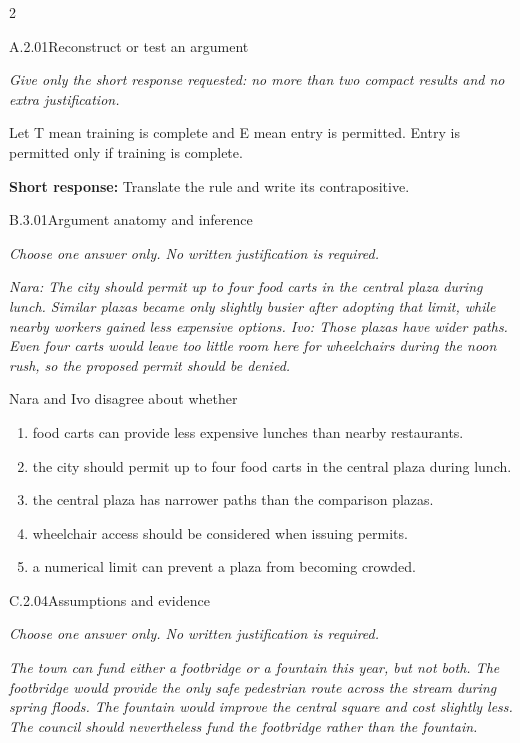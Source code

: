 \documentclass[9pt]{extarticle}
\newcommand{\choice}[1]{\item #1}
\begin{document}
\begin{multicols}{2}
\begin{DenseCoreProblem}{A.2.01}{Reconstruct or test an argument}
{\scriptsize\textit{Give only the short response requested: no more than two compact results and no extra justification.}\par}
Let T mean training is complete and E mean entry is permitted. Entry is permitted only if training is complete.

\textbf{Short response:} Translate the rule and write its contrapositive.
\end{DenseCoreProblem}
\begin{DenseCoreProblem}{B.3.01}{Argument anatomy and inference}
{\scriptsize\textit{Choose one answer only. No written justification is required.}\par}
\emph{Nara: The city should permit up to four food carts in the central plaza during lunch. Similar plazas became only slightly busier after adopting that limit, while nearby workers gained less expensive options. Ivo: Those plazas have wider paths. Even four carts would leave too little room here for wheelchairs during the noon rush, so the proposed permit should be denied.}

Nara and Ivo disagree about whether
\begin{enumerate}[label=(\alph*)]
  \choice{food carts can provide less expensive lunches than nearby restaurants.}
  \choice{the city should permit up to four food carts in the central plaza during lunch.}
  \choice{the central plaza has narrower paths than the comparison plazas.}
  \choice{wheelchair access should be considered when issuing permits.}
  \choice{a numerical limit can prevent a plaza from becoming crowded.}
\end{enumerate}
\end{DenseCoreProblem}
\columnbreak
\begin{DenseCoreProblem}{C.2.04}{Assumptions and evidence}
{\scriptsize\textit{Choose one answer only. No written justification is required.}\par}
\emph{The town can fund either a footbridge or a fountain this year, but not both. The footbridge would provide the only safe pedestrian route across the stream during spring floods. The fountain would improve the central square and cost slightly less. The council should nevertheless fund the footbridge rather than the fountain.}


\end{DenseCoreProblem}
\end{multicols}
\end{document}
